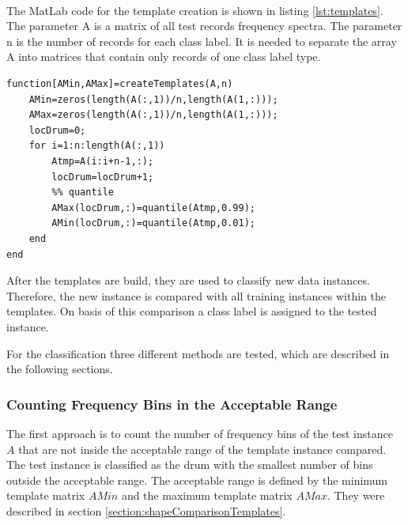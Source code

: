 The MatLab\textsuperscript{\textregistered} code for the template creation is shown in listing \ref{lst:templates}. The parameter A is a matrix of all test records frequency spectra. The parameter n is the number of records for each class label. It is needed to separate the array A into matrices that contain only records of one class label type.

\begin{lstlisting}[caption={Template creation},label={lst:templates}]
function[AMin,AMax]=createTemplates(A,n)
	AMin=zeros(length(A(:,1))/n,length(A(1,:)));
	AMax=zeros(length(A(:,1))/n,length(A(1,:)));
	locDrum=0;
	for i=1:n:length(A(:,1))				
		Atmp=A(i:i+n-1,:);
		locDrum=locDrum+1;				
		%% quantile
		AMax(locDrum,:)=quantile(Atmp,0.99);
		AMin(locDrum,:)=quantile(Atmp,0.01);   
	end
end
\end{lstlisting}

After the templates are build, they are used to classify new data instances. Therefore, the new instance is compared with all training instances within the templates. On basis of this comparison a class label is assigned to the tested instance. 

For the classification three different methods are tested, which are described in the following sections.

\subsubsection{Counting Frequency Bins in the Acceptable Range}
\label{section:shapeComparisonClassification1}

The first approach is to count the number of frequency bins of the test instance $A$ that are not inside the acceptable range of the template instance compared. The test instance is classified as the drum with the smallest number of bins outside the acceptable range. The acceptable range is defined by the minimum template matrix $AMin$ and the maximum template matrix $AMax$. They were described in section \ref{section:shapeComparisonTemplates}. 


